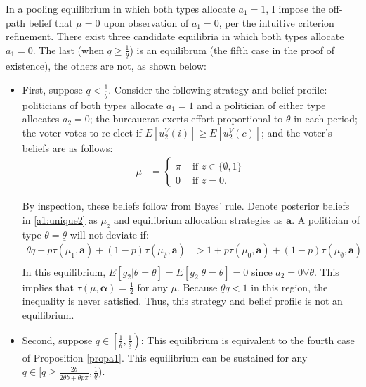 \documentclass[11pt,english]{article}
\begin{document}
In a pooling equilibrium in which both types allocate $a_1 = 1$, I impose the off-path belief that $\mu = 0$ upon observation of $a_1 = 0$, per the intuitive criterion refinement. There exist three candidate equilibria in which both types allocate $a_1 =0$. The last (when $q\geq \frac{1}{\underline{\theta}}$) is an equilibrum (the fifth case in the proof of existence), the others are not, as shown below:

\begin{itemize}
\item First, suppose $q <\frac{1}{\overline{\theta}}$. Consider the following strategy and belief profile: politicians of both types allocate $a_1 = 1$ and a politician of either type allocates $a_2=0$; the bureaucrat exerts effort proportional to $\theta$ in each period; the voter votes to re-elect if $E[u_2^V(i)] \geq E[u_2^V(c)]$; and the voter's beliefs are as follows:
\begin{align}\label{a1:unique2}
\mu &= \begin{cases}
\pi & \text{ if } z \in \{\emptyset, 1\}\\
0 & \text{ if } z = 0.
\end{cases}
\end{align}

By inspection, these beliefs follow from Bayes' rule. Denote posterior beliefs in \ref{a1:unique2} as $\mu_z$ and  equilibrium allocation strategies as $\boldsymbol{a}$. A politician of type $\theta = \underline{\theta}$ will not deviate if:
\begin{align*}
\underline{\theta}q + p\tau(\mu_1, \boldsymbol{a}) + (1-p)\tau(\mu_\emptyset, \boldsymbol{a})  &> 1 + p\tau(\mu_0, \boldsymbol{a}) + (1-p)\tau(\mu_\emptyset, \boldsymbol{a})\\
\end{align*}
In this equilibrium, $E[g_2|\theta = \overline{\theta}] = E[g_2|\theta =\underline{\theta}] = 0$ since $a_2 = 0 \forall \theta$. This implies that $\tau(\mu, \boldsymbol{\alpha}) = \frac{1}{2}$ for any $\mu$. Because $\underline{\theta}q< 1$ in this region, the inequality is never satisfied. Thus, this strategy and belief profile is not an equilibrium.

\item Second, suppose $q \in \left[\frac{1}{\overline{\theta}}, \frac{1}{\underline{\theta}}\right)$: This equilibrium is equivalent to the fourth case of Proposition \ref{propa1}. This equilibrium can be sustained for any $q \in [q \geq \frac{2b}{2\underline{\theta}b + \overline{\theta}p\pi}, \frac{1}{\underline{\theta}})$.
\end{itemize}
\end{document}
